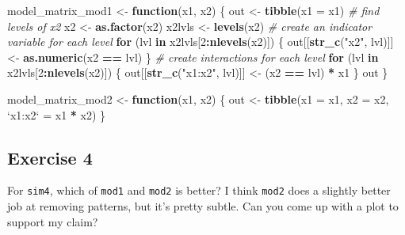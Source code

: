 \documentclass[]{book}
\newenvironment{Shaded}{\begin{snugshade}}{\end{snugshade}}
\newcommand{\CommentTok}[1]{\textcolor[rgb]{0.56,0.35,0.01}{\textit{#1}}}
\newcommand{\ControlFlowTok}[1]{\textcolor[rgb]{0.13,0.29,0.53}{\textbf{#1}}}
\newcommand{\DataTypeTok}[1]{\textcolor[rgb]{0.13,0.29,0.53}{#1}}
\newcommand{\DecValTok}[1]{\textcolor[rgb]{0.00,0.00,0.81}{#1}}
\newcommand{\KeywordTok}[1]{\textcolor[rgb]{0.13,0.29,0.53}{\textbf{#1}}}
\newcommand{\NormalTok}[1]{#1}
\newcommand{\OperatorTok}[1]{\textcolor[rgb]{0.81,0.36,0.00}{\textbf{#1}}}
\newcommand{\StringTok}[1]{\textcolor[rgb]{0.31,0.60,0.02}{#1}}
\theoremstyle{definition}
\theoremstyle{definition}
\theoremstyle{definition}
\theoremstyle{remark}
\begin{document}
\begin{Shaded}
\begin{Highlighting}[]
\NormalTok{model_matrix_mod1 <-}\StringTok{ }\ControlFlowTok{function}\NormalTok{(x1, x2) \{}
\NormalTok{  out <-}\StringTok{ }\KeywordTok{tibble}\NormalTok{(}\DataTypeTok{x1 =}\NormalTok{ x1)  }
  \CommentTok{# find levels of x2}
\NormalTok{  x2 <-}\StringTok{ }\KeywordTok{as.factor}\NormalTok{(x2)}
\NormalTok{  x2lvls <-}\StringTok{ }\KeywordTok{levels}\NormalTok{(x2)}
  \CommentTok{# create an indicator variable for each level}
  \ControlFlowTok{for}\NormalTok{ (lvl }\ControlFlowTok{in}\NormalTok{ x2lvls[}\DecValTok{2}\OperatorTok{:}\KeywordTok{nlevels}\NormalTok{(x2)]) \{}
\NormalTok{    out[[}\KeywordTok{str_c}\NormalTok{(}\StringTok{"x2"}\NormalTok{, lvl)]] <-}\StringTok{ }\KeywordTok{as.numeric}\NormalTok{(x2 }\OperatorTok{==}\StringTok{ }\NormalTok{lvl)}
\NormalTok{  \}}
  \CommentTok{# create interactions for each level}
  \ControlFlowTok{for}\NormalTok{ (lvl }\ControlFlowTok{in}\NormalTok{ x2lvls[}\DecValTok{2}\OperatorTok{:}\KeywordTok{nlevels}\NormalTok{(x2)]) \{}
\NormalTok{    out[[}\KeywordTok{str_c}\NormalTok{(}\StringTok{"x1:x2"}\NormalTok{, lvl)]] <-}\StringTok{ }\NormalTok{(x2 }\OperatorTok{==}\StringTok{ }\NormalTok{lvl) }\OperatorTok{*}\StringTok{ }\NormalTok{x1}
\NormalTok{  \}}
\NormalTok{  out}
\NormalTok{\}}
\end{Highlighting}
\end{Shaded}

\begin{Shaded}
\begin{Highlighting}[]
\NormalTok{model_matrix_mod2 <-}\StringTok{ }\ControlFlowTok{function}\NormalTok{(x1, x2) \{}
\NormalTok{  out <-}\StringTok{ }\KeywordTok{tibble}\NormalTok{(}\DataTypeTok{x1 =}\NormalTok{ x1,}
                \DataTypeTok{x2 =}\NormalTok{ x2,}
                \StringTok{`}\DataTypeTok{x1:x2}\StringTok{`}\NormalTok{ =}\StringTok{ }\NormalTok{x1 }\OperatorTok{*}\StringTok{ }\NormalTok{x2)}
\NormalTok{\}}
\end{Highlighting}
\end{Shaded}

\hypertarget{exercise-4-34}{%
\subsection{Exercise 4}\label{exercise-4-34}}

For \texttt{sim4}, which of \texttt{mod1} and \texttt{mod2} is better? I
think \texttt{mod2} does a slightly better job at removing patterns, but
it's pretty subtle. Can you come up with a plot to support my claim?
\end{document}
